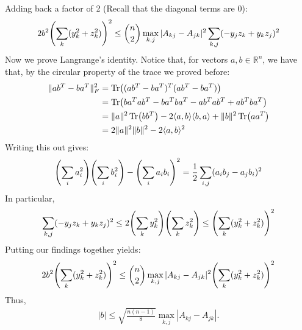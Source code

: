 \documentclass[12pt]{article}
\theoremstyle{definitionstyle}
\def\mbb#1{\mathbb{#1}}
\def\R{\mbb{R}}
\newcommand{\mg}[1]{\| #1 \|}
\renewcommand{\ip}[1]{\langle#1\rangle}
\newcommand{\1}{\mathds 1}
\begin{document}
\begin{enumerate}
        Adding back a factor of 2 (Recall that the diagonal terms are 0):
        \begin{align*}
            2b^2 \qty(\sum_k (y_k^2+z_k^2))^2 \leq {n \choose 2}\max_{k,j} |A_{kj}-A_{jk}|^2\sum_{k,j} (-y_jz_k + y_kz_j)^2
        \end{align*}
        Now we prove Langrange's identity. Notice that, for vectors $a, b \in \R^n$, we have that, by the circular property of the trace we proved before:
        \begin{align*}
            \mg{ab^T - ba^T}_F^2 &= \Tr((ab^T - ba^T)^T(ab^T - ba^T)) 
            \\&= \Tr(ba^Tab^T - ba^Tba^T - ab^Tab^T + ab^Tba^T)
            \\&= \mg{a}^2 \Tr(bb^T) - 2\ip{a,b}\ip{b,a} + \mg{b}^2\Tr(aa^T)
            \\&= 2\mg{a}^2\mg{b}^2 - 2\ip{a,b}^2
        \end{align*}
        Writing this out gives:
        \begin{align*}
            \qty(\sum_i a_i^2) \qty(\sum_i b_i^2) - \qty(\sum_i a_ib_i)^2 = \frac 12 \sum_{i,j} (a_ib_j-a_jb_i)^2
        \end{align*}
        In particular,
        \begin{align*}
            \sum_{k,j} (-y_jz_k + y_kz_j)^2 \leq 2\qty(\sum_k y_k^2)\qty(\sum_k z_k^2) \leq \qty(\sum_k (y_k^2+z_k^2))^2
        \end{align*}
        Putting our findings together yields:
        \begin{align*}
            2b^2 \qty(\sum_k (y_k^2+z_k^2))^2 \leq {n \choose 2}\max_{k,j} |A_{kj}-A_{jk}|^2 \qty(\sum_k (y_k^2+z_k^2))^2
        \end{align*}
        Thus,
        \begin{align*}
            |b| \leq \sqrt{\frac{n(n-1)}{8}} \max_{k,j} |A_{kj}-A_{jk}|. 
        \end{align*}
    \end{enumerate}
\end{document}
